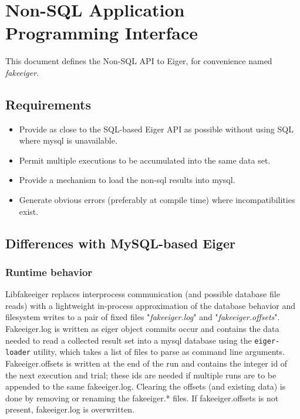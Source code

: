 \section{Non-SQL Application Programming Interface}
\label{sec:fakeapi}
This document defines the Non-SQL API to Eiger, for convenience named {\em fakeeiger}.

\subsection{Requirements}

\begin{itemize}
\item Provide as close to the SQL-based Eiger API as possible without using SQL where mysql is unavailable.

\item Permit multiple executions to be accumulated into the same data set.

\item Provide a mechanism to load the non-sql results into mysql.
 
\item Generate obvious errors (preferably at compile time) where incompatibilities exist.

\end{itemize}

\subsection{Differences with MySQL-based Eiger}

\subsubsection {Runtime behavior} 
Libfakeeiger replaces interprocess communication (and possible database file reads)  with a lightweight in-process approximation of the database behavior and filesystem writes to a pair of fixed files "{\em fakeeiger.log}" and "{\em fakeeiger.offsets}". Fakeeiger.log is written as eiger object commits occur and contains the data needed to read a collected result set into a mysql database using the \texttt{eiger-loader} utility, which takes a list of files to parse as command line arguments. Fakeeiger.offsets is written at the end of the run and contains the integer id of the next execution and trial; these ids are needed if multiple runs are to be appended to the same fakeeiger.log. Clearing the offsets (and existing data) is done by removing or renaming the fakeeiger.* files. If fakeeiger.offsets is not present, fakeeiger.log is overwritten. 


